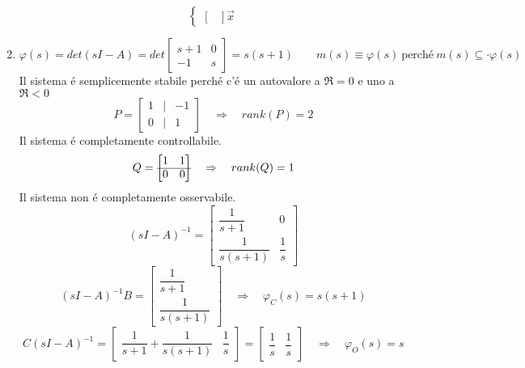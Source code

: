 \documentclass[../main.tex]{subfiles}
\begin{document}
\begin{enumerate}
\[\begin{cases}
\begin{bmatrix}
							\end{bmatrix} \vec x
						\end{cases}
					\]
				\item 
					\[
						\varphi(s) = det(sI-A) = det
						\begin{bmatrix}
							s+1 & 0\\
							-1 & s
						\end{bmatrix} = s(s+1)
						\qquad
						m(s) \equiv \varphi(s)\ \text{perch\'e}\ m(s) \subseteq\cdot \varphi(s)
					\]
					Il sistema \'e semplicemente stabile perch\'e c'\'e un autovalore a $ \Re = 0 $ e uno a $ \Re < 0 $
					\[
						P =
						\begin{bmatrix}
							1 & | & -1\\
							0 & | & 1
						\end{bmatrix}
						\quad\Rightarrow\quad
						rank(P) = 2
					\]
					Il sistema \'e completamente controllabile.
					\[
						Q =
						\begin{bmatrix}
							1 & 1\\
							\cline{1-2}
							0 & 0
						\end{bmatrix}
						\quad\Rightarrow\quad
						rank(Q) = 1
					\]
					Il sistema non \'e completamente osservabile.
					\[
						(sI-A)^{-1} =
						\begin{bmatrix}
							\dfrac{1}{s+1} & 0\\[.5cm]
							\dfrac{1}{s(s+1)} & \dfrac{1}{s}
						\end{bmatrix}
					\]
					\[
						(sI-A)^{-1}B =
						\begin{bmatrix}
							\dfrac{1}{s+1}\\[.5cm]
							\dfrac{1}{s(s+1)}
						\end{bmatrix}
						\quad\Rightarrow\quad
						\varphi_C(s) = s(s+1)
					\]
					\[
						C(sI-A)^{-1} = 
						\begin{bmatrix}
							\dfrac{1}{s+1}+\dfrac{1}{s(s+1)} & \dfrac{1}{s}
						\end{bmatrix} =
						\begin{bmatrix}
							\dfrac{1}{s} & \dfrac{1}{s}
						\end{bmatrix}
						\quad\Rightarrow\quad
						\varphi_O(s) = s
					\]
			\end{enumerate}
		
\end{document}
